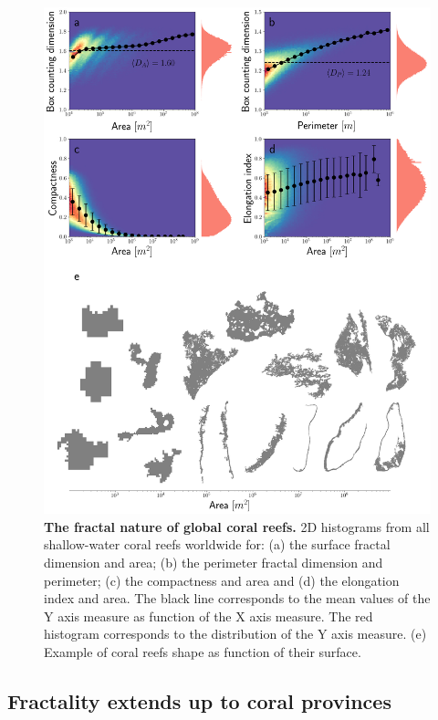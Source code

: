\begin{figure}[H]
    \centering

    \includegraphics[width=1\textwidth]{Figures/individual_reef_analysis_complete.pdf}
    \caption[The fractal nature of global coral reefs]{\textbf{The fractal
            nature of global coral reefs.} 2D
        histograms from all shallow-water coral reefs worldwide for: (a) the
        surface
        fractal dimension and area; (b) the perimeter fractal dimension and
        perimeter;
        (c) the compactness and area and (d) the elongation index and area. The
        black
        line corresponds to the mean values of the Y axis measure as function
        of the X
        axis measure. The red histogram corresponds to the distribution of the
        Y axis
        measure. (e) Example of coral reefs shape as function of their
        surface.}
    \label{fig:individual_reef_analysis}
\end{figure}

\subsection{Fractality extends up to coral provinces}

